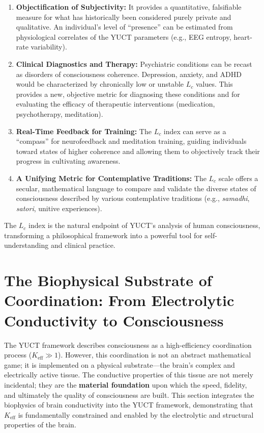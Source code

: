 \documentclass[12pt,a4paper]{article}
\begin{document}
	\begin{enumerate}
		\item \textbf{Objectification of Subjectivity:} It provides a quantitative, falsifiable measure for what has historically been considered purely private and qualitative. An individual's level of ``presence'' can be estimated from physiological correlates of the YUCT parameters (e.g., EEG entropy, heart-rate variability).
		\item \textbf{Clinical Diagnostics and Therapy:} Psychiatric conditions can be recast as disorders of consciousness coherence. Depression, anxiety, and ADHD would be characterized by chronically low or unstable \(L_c\) values. This provides a new, objective metric for diagnosing these conditions and for evaluating the efficacy of therapeutic interventions (medication, psychotherapy, meditation).
		\item \textbf{Real-Time Feedback for Training:} The \(L_c\) index can serve as a ``compass'' for neurofeedback and meditation training, guiding individuals toward states of higher coherence and allowing them to objectively track their progress in cultivating awareness.
		\item \textbf{A Unifying Metric for Contemplative Traditions:} The \(L_c\) scale offers a secular, mathematical language to compare and validate the diverse states of consciousness described by various contemplative traditions (e.g., \textit{samadhi}, \textit{satori}, unitive experiences).
	\end{enumerate}
	
	The \(L_c\) index is the natural endpoint of YUCT's analysis of human consciousness, transforming a philosophical framework into a powerful tool for self-understanding and clinical practice.
	
	\section{The Biophysical Substrate of Coordination: From Electrolytic Conductivity to Consciousness}
	
	The YUCT framework describes consciousness as a high-efficiency coordination process (\(K_{\mathrm{eff}} \gg 1\)). However, this coordination is not an abstract mathematical game; it is implemented on a physical substrate—the brain's complex and electrically active tissue. The conductive properties of this tissue are not merely incidental; they are the \textbf{material foundation} upon which the speed, fidelity, and ultimately the quality of consciousness are built. This section integrates the biophysics of brain conductivity into the YUCT framework, demonstrating that \(K_{\mathrm{eff}}\) is fundamentally constrained and enabled by the electrolytic and structural properties of the brain.
	
\end{document}
